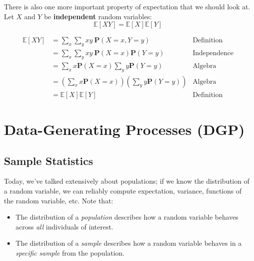 \documentclass[
  letterpaper,
  DIV=11,
  numbers=noendperiod]{scrreprt}
\providecommand{\tightlist}{%
  \setlength{\itemsep}{0pt}\setlength{\parskip}{0pt}}\usepackage{longtable,booktabs,array}
\begin{document}
There is also one more important property of expectation that we should
look at. Let \(X\) and \(Y\) be \textbf{independent} random variables:
\[ \mathbb{E}[XY] = \mathbb{E}[X]\mathbb{E}[Y] \]

\begin{tcolorbox}[enhanced jigsaw, titlerule=0mm, bottomtitle=1mm, arc=.35mm, colframe=quarto-callout-tip-color-frame, rightrule=.15mm, opacityback=0, opacitybacktitle=0.6, leftrule=.75mm, breakable, toprule=.15mm, colback=white, left=2mm, colbacktitle=quarto-callout-tip-color!10!white, toptitle=1mm, bottomrule=.15mm, title=\textcolor{quarto-callout-tip-color}{\faLightbulb}\hspace{0.5em}{Proof}, coltitle=black]

\[\begin{align}
   \mathbb{E}[XY] &= \sum_x\sum_y xy\ \textbf{P}(X=x, Y=y) &\text{Definition} \\
   &= \sum_x\sum_y xy\ \textbf{P}(X=x)\textbf{P}(Y=y) &\text{Independence}\\
   &= \sum_x x\textbf{P}(X=x) \sum_y y \textbf{P}(Y=y) &\text{Algebra}\\
   &= \left(\sum_x x\textbf{P}(X=x)\right) \left(\sum_y y \textbf{P}(Y=y)\right) &\text{Algebra}\\
   &= \mathbb{E}[X]\mathbb{E}[Y] &\text{Definition}
\end{align}\]

\end{tcolorbox}

\section{Data-Generating Processes
(DGP)}\label{data-generating-processes-dgp}

\subsection{Sample Statistics}\label{sample-statistics}

Today, we've talked extensively about populations; if we know the
distribution of a random variable, we can reliably compute expectation,
variance, functions of the random variable, etc. Note that:

\begin{itemize}
\tightlist
\item
  The distribution of a \emph{population} describes how a random
  variable behaves across \emph{all} individuals of interest.
\item
  The distribution of a \emph{sample} describes how a random variable
  behaves in a \emph{specific sample} from the population.
\end{itemize}
\end{document}
